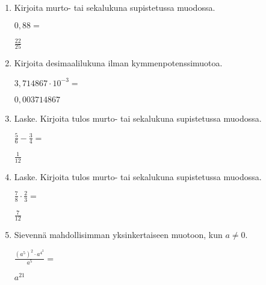 \documentclass[finnish, a4paper, 12pt]{article}
\begin{document}
	\begin{enumerate}[leftmargin=*]
		\setlength\itemsep{1em}
		
		\item %
		Kirjoita murto- tai sekalukuna supistetussa muodossa. 
		
		\(
		0{,}88 = 
		\) %
		
		\begin{version:withAnswers}
		\( \frac{22}{25} \)
		\end{version:withAnswers}

		\vspace{8pt}
		
		\item %
		Kirjoita desimaalilukuna ilman kymmenpotenssimuotoa. 
		
		\(
		3{,}714867\cdot 10^{-3} = 
		\) %
		\begin{version:withAnswers}
		\( 0,003714867 \)
		\end{version:withAnswers}	
		\vspace{8pt}
		
		\item %
		Laske. Kirjoita tulos murto- tai sekalukuna supistetussa muodossa.
		
		\(
		\displaystyle
		\frac{5}{6}-\frac{3}{4} = 
		\) %
		\begin{version:withAnswers}
		\( \frac{1}{12} \)
		\end{version:withAnswers}	
		
		\vspace{8pt}
		
		\item %
		Laske. Kirjoita tulos murto- tai sekalukuna supistetussa muodossa.
		
		\(
		\displaystyle
		\frac{7}{8}\cdot\frac{2}{3} = 
		\) %
		\begin{version:withAnswers}
		\( \frac{7}{12} \)
		\end{version:withAnswers}
		
		\vspace{8pt}
		
		\item %
		Sievennä mahdollisimman yksinkertaiseen muotoon, kun \(a \not = 0\). 
		
		\(
		\displaystyle
		\frac{\left(a^5\right)^2 \cdot a^{4^2}}{a^5} =
		\phantom{mmmmmmmmmmmmmmm}
		\) %
		\begin{version:withAnswers}
		\(  a^{21} \)
		\end{version:withAnswers}
		

\end{enumerate}
\end{document}
